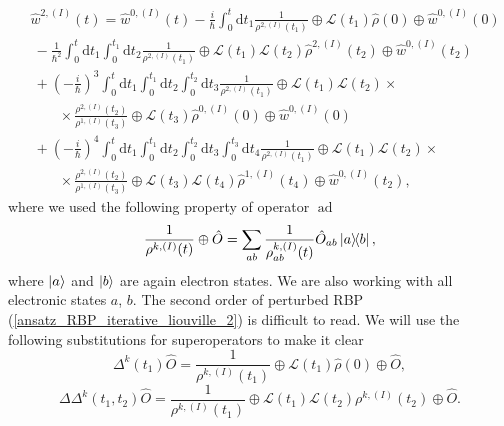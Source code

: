 \begin{equation}
\label{ansatz_RBP_iterative_liouville_2}
    \begin{aligned}
    &\hat{w}^{2,(I)}(t) = \hat{w}^{0, (I)}(t) - \frac{i}{\hbar}\int_{0}^{t} \mathrm{d} t_1 \frac{1}{\rho^{2, (I)}(t_1)} \oplus \mathcal{L}(t_1) \hat{\rho}(0) \oplus \hat{w}^{0, (I)}(0)  \\
     &\: -\frac{1}{\hbar^2} \int_{0}^{t} \mathrm{d} t_1 \int_{0}^{t_1} \mathrm{d} t_2 \frac{1}{\rho^{2, (I)}(t_1)} \oplus \mathcal{L}(t_1) \mathcal{L}(t_2) \hat{\rho}^{2, (I)}(t_2) \oplus \hat{w}^{0, (I)}(t_2)\\
     &\: +\left(-\frac{i}{\hbar}\right)^3 \int_{0}^{t} \mathrm{d} t_1 \int_{0}^{t_1} \mathrm{d} t_2 \int_{0}^{t_2} \mathrm{d} t_3 \frac{1}{\rho^{2, (I)}(t_1)} \oplus \mathcal{L}(t_1) \mathcal{L}(t_2) \times \\
     & \quad \quad \times\frac{\rho^{2, (I)}(t_2)}{\rho^{1, (I)}(t_3)} \oplus \mathcal{L}(t_3) \hat{\rho}^{0, (I)}(0) \oplus \hat{w}^{0, (I)}(0) \\
     &\: +\left(-\frac{i}{\hbar}\right)^4 \int_{0}^{t} \mathrm{d} t_1 \int_{0}^{t_1} \mathrm{d} t_2 \int_{0}^{t_2} \mathrm{d} t_3 \int_{0}^{t_3} \mathrm{d} t_4 \frac{1}{\rho^{2, (I)}(t_1)} \oplus \mathcal{L}(t_1) \mathcal{L}(t_2) \times \\
     & \quad \quad \times\frac{\rho^{2, (I)}(t_2)}{\rho^{1, (I)}(t_3)} \oplus \mathcal{L}(t_3) \mathcal{L}(t_4) \hat{\rho}^{1, (I)}(t_4) \oplus \hat{w}^{0, (I)}(t_2),
    \end{aligned}
\end{equation}
where we used the following property of operator $\operatorname{ad}$
\begin{equation}
    \frac{1}{\rho^{k, (I)}(t)} \oplus \hat{O} = \sum_{ab} \frac{1}{\rho^{k, (I)}_{ab}(t)} \hat{O}_{ab} \ketbra{a}{b},
\end{equation}
where $\ket{a}$ and $\ket{b}$ are again electron states. We are also working with all electronic states $a$, $b$. The second order of perturbed RBP (\ref{ansatz_RBP_iterative_liouville_2}) is difficult to read. We will use the following substitutions for superoperators to make it clear
\begin{equation}
    \Delta^{k}(t_1) \hat{O} = \frac{1}{\rho^{k, (I)}(t_1)} \oplus \mathcal{L}(t_1) \hat{\rho}(0) \oplus \hat{O},
\end{equation}
\begin{equation}
    \Delta\Delta^{k}(t_1, t_2) \hat{O} = \frac{1}{\rho^{k, (I)}(t_1)} \oplus \mathcal{L}(t_1) \mathcal{L}(t_2) \rho^{k, (I)}(t_2) \oplus \hat{O} .
\end{equation}
